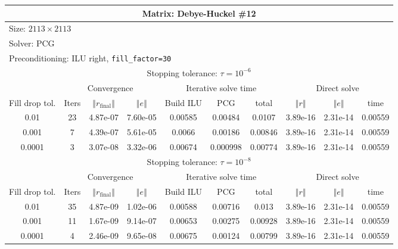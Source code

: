 \documentclass[oneside,final]{amsart}  %
\begin{document}
\begin{tabular}{|c|c|c|c|c|c|c|c|c|c|}
\hline
\multicolumn{10}{|c|}{Matrix: Debye-Huckel \#12}\tabularnewline
\hline
  \multicolumn{10}{|l|}{Size: $2113\times2113$}\tabularnewline
\hline
\multicolumn{10}{|l|}{Solver: PCG}\tabularnewline
\hline
\multicolumn{10}{|l|}{Preconditioning: ILU right, \texttt{fill\_factor=30}}\tabularnewline
\hline
\hline
\multicolumn{10}{|c|}{Stopping tolerance: $\tau=10^{-6}$}\tabularnewline
\hline
\hline
 & \multicolumn{3}{c|}{Convergence} & \multicolumn{3}{c|}{Iterative solve time} & \multicolumn{3}{c|}{Direct solve}\tabularnewline
\hline
Fill drop tol.  & Iters & $\left\Vert r_{\text{final}}\right\Vert $  & $\left\Vert e\right\Vert $  & Build ILU  & PCG  & total  & $\left\Vert r\right\Vert $ & $\left\Vert e\right\Vert $  & time\tabularnewline
\hline
  0.01 & 23 & 4.87e-07 & 7.60e-05 &    0.00585 &    0.00484 &     0.0107 & 3.89e-16 & 2.31e-14 &    0.00559\\
  \hline
  0.001 & 7 & 4.39e-07 & 5.61e-05 &     0.0066 &    0.00186 &    0.00846 & 3.89e-16 & 2.31e-14 &    0.00559\\
  \hline
  0.0001 & 3 & 3.07e-08 & 3.32e-06 &    0.00674 &   0.000998 &    0.00774 & 3.89e-16 & 2.31e-14 &    0.00559\\
  \hline
\hline
\multicolumn{10}{|c|}{Stopping tolerance: $\tau=10^{-8}$}\tabularnewline
\hline
\hline
 & \multicolumn{3}{c|}{Convergence} & \multicolumn{3}{c|}{Iterative solve time} & \multicolumn{3}{c|}{Direct solve }\tabularnewline
\hline
Fill drop tol.  & Iters  & $\left\Vert r_{\text{final}}\right\Vert $  & $\left\Vert e\right\Vert $ & Build ILU  & PCG  & total  & $\left\Vert r\right\Vert $  & $\left\Vert e\right\Vert $  & time\tabularnewline
\hline
  0.01 & 35 & 4.87e-09 & 1.02e-06 &    0.00588 &    0.00716 &      0.013 & 3.89e-16 & 2.31e-14 &    0.00559\\
  \hline
  0.001 & 11 & 1.67e-09 & 9.14e-07 &    0.00653 &    0.00275 &    0.00928 & 3.89e-16 & 2.31e-14 &    0.00559\\
  \hline
  0.0001 & 4 & 2.46e-09 & 9.65e-08 &    0.00675 &    0.00124 &    0.00799 & 3.89e-16 & 2.31e-14 &    0.00559\\
  \hline
\end{tabular}
\end{document}
